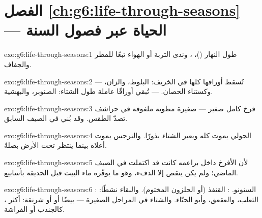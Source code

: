 \section*{الفصل \ref{ch:g6:life-through-seasons} --- الحياة عبر فصول السنة}

\begin{solution}{exo:g6:life-through-seasons:1}
طول النهار ()، ، وندى التربة أو الهواء تبعًا
للمطر والجفاف.
\end{solution}

\begin{solution}{exo:g6:life-through-seasons:2}
 --- تُسقط أوراقها كلها في الخريف: البلوط، والزان، وكستناء
الحصان.  --- تُبقي أوراقًا عاملة طول الشتاء: الصنوبر،
والبهشية.
\end{solution}

\begin{solution}{exo:g6:life-through-seasons:3}
فرخ كامل صغير ---  صغيرة مطوية ملفوفة في حراشف تصدّ الطقس.
وقد بُني في الصيف السابق.
\end{solution}

\begin{solution}{exo:g6:life-through-seasons:4}
الحولي يموت كله ويعبر الشتاء بذورًا. والنرجس يموت أعلاه بينما
ينتظر  تحت الأرض بصلةً.
\end{solution}

\begin{solution}{exo:g6:life-through-seasons:5}
لأن الأفرخ داخل براعمه كانت قد اكتملت في الصيف الماضي؛ ولم يكن
ينقص  إلا الدفء، وهو ما يوفّره ماء البيت قبل الحديقة
بأسابيع.
\end{solution}

\begin{solution}{exo:g6:life-through-seasons:6}
: السنونو. : القنفذ (أو الحلزون المختوم). والبقاء
نشطًا: الثعلب، والعقعق، وأبو الحنّاء. والشتاء في المراحل الصغيرة ---
بيضًا أو  أو شرنقة: أكثر ، كالجندب أو الفراشة.
\end{solution}

